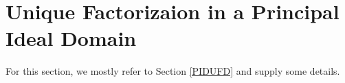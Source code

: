 \section{Unique Factorizaion in a Principal Ideal Domain}
For this section, we mostly refer to Section \ref{PIDUFD} and supply some details. 

